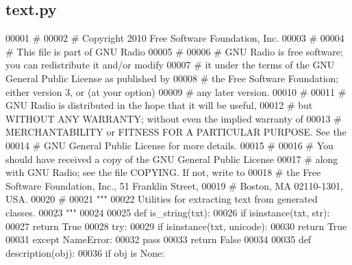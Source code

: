 \subsection{text.\+py}
\label{text_8py_source}

\begin{DoxyCode}
00001 \textcolor{comment}{#}
00002 \textcolor{comment}{# Copyright 2010 Free Software Foundation, Inc.}
00003 \textcolor{comment}{#}
00004 \textcolor{comment}{# This file is part of GNU Radio}
00005 \textcolor{comment}{#}
00006 \textcolor{comment}{# GNU Radio is free software; you can redistribute it and/or modify}
00007 \textcolor{comment}{# it under the terms of the GNU General Public License as published by}
00008 \textcolor{comment}{# the Free Software Foundation; either version 3, or (at your option)}
00009 \textcolor{comment}{# any later version.}
00010 \textcolor{comment}{#}
00011 \textcolor{comment}{# GNU Radio is distributed in the hope that it will be useful,}
00012 \textcolor{comment}{# but WITHOUT ANY WARRANTY; without even the implied warranty of}
00013 \textcolor{comment}{# MERCHANTABILITY or FITNESS FOR A PARTICULAR PURPOSE.  See the}
00014 \textcolor{comment}{# GNU General Public License for more details.}
00015 \textcolor{comment}{#}
00016 \textcolor{comment}{# You should have received a copy of the GNU General Public License}
00017 \textcolor{comment}{# along with GNU Radio; see the file COPYING.  If not, write to}
00018 \textcolor{comment}{# the Free Software Foundation, Inc., 51 Franklin Street,}
00019 \textcolor{comment}{# Boston, MA 02110-1301, USA.}
00020 \textcolor{comment}{#}
00021 \textcolor{stringliteral}{"""}
00022 \textcolor{stringliteral}{Utilities for extracting text from generated classes.}
00023 \textcolor{stringliteral}{"""}
00024 
00025 \textcolor{keyword}{def }is_string(txt):
00026     \textcolor{keywordflow}{if} isinstance(txt, str):
00027         \textcolor{keywordflow}{return} \textcolor{keyword}{True}
00028     \textcolor{keywordflow}{try}:
00029         \textcolor{keywordflow}{if} isinstance(txt, unicode):
00030             \textcolor{keywordflow}{return} \textcolor{keyword}{True}
00031     \textcolor{keywordflow}{except} NameError:
00032         \textcolor{keywordflow}{pass}
00033     \textcolor{keywordflow}{return} \textcolor{keyword}{False}
00034 
00035 \textcolor{keyword}{def }description(obj):
00036     \textcolor{keywordflow}{if} obj \textcolor{keywordflow}{is} \textcolor{keywordtype}{None}:

\end{DoxyCode}
